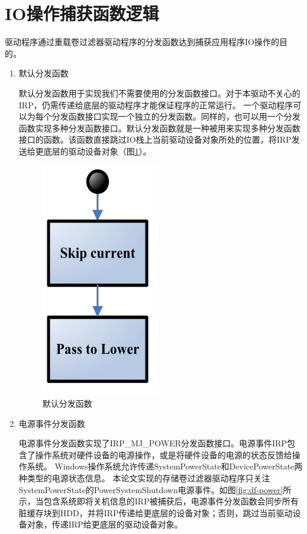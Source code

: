 
\section{IO操作捕获函数逻辑}
\label{sec:capture_io_logic}

驱动程序通过重载卷过滤器驱动程序的分发函数达到捕获应用程序IO操作的目的。

\begin{enumerate}

\item 默认分发函数

默认分发函数用于实现我们不需要使用的分发函数接口。对于本驱动不关心的IRP，仍需传递给底层的驱动程序才能保证程序的正常运行。
一个驱动程序可以为每个分发函数接口实现一个独立的分发函数。同样的，也可以用一个分发函数实现多种分发函数接口。默认分发函数就是一种被用来实现多种分发函数接口的函数。该函数直接跳过IO栈上当前驱动设备对象所处的位置，将IRP发送给更底层的驱动设备对象（图\ref{fig:df-default}）。

\begin{figure}[htb]
\centering
\includegraphics[width=0.2\linewidth]{./graph/df-default}
\caption{默认分发函数}
\label{fig:df-default}
\end{figure}

\item 电源事件分发函数

电源事件分发函数实现了IRP\_MJ\_POWER分发函数接口。电源事件IRP包含了操作系统对硬件设备的电源操作，或是将硬件设备的电源的状态反馈给操作系统。
Windows操作系统允许传递SystemPowerState和DevicePowerState两种类型的电源状态信息。
本论文实现的存储卷过滤器驱动程序只关注SystemPowerState的PowerSystemShutdown电源事件。如图\ref{fig:df-power}所示，当包含系统即将关机信息的IRP被捕获后，电源事件分发函数会同步所有脏缓存块到HDD，并将IRP传递给更底层的设备对象；否则，跳过当前驱动设备对象，传递IRP给更底层的驱动设备对象。


\end{enumerate}
